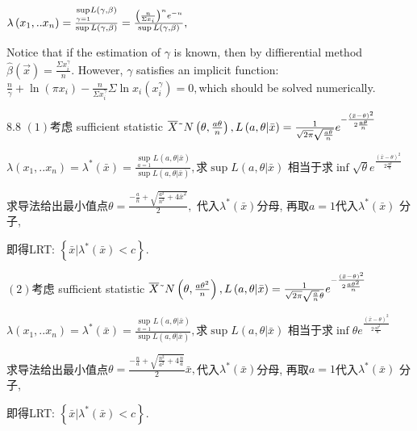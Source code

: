 \documentclass{article}
\begin{document}
$\lambda \left( x_{1},..x_{n}\right) =\frac{\underset{\gamma =1}{\sup }%
L\left( \gamma ,\beta \right) }{\sup L\left( \gamma ,\beta \right) }=\frac{%
\left( \frac{n}{\Sigma x_{i}}\right) ^{n}e^{-n}}{\sup L\left( \gamma ,\beta
\right) },$

Notice that if the estimation of $\gamma $ is known, then by diffierential
method $\hat{\beta}\left( \vec{x}\right) =\frac{\Sigma x_{i}^{\gamma }}{n}.$%
However, $\gamma $ satisfies an implicit function: $\frac{n}{\gamma }+\ln
\left( \pi x_{i}\right) -\frac{n}{\Sigma x_{i}^{\gamma }}\Sigma \ln
x_{i}\left( x_{i}^{\gamma }\right) =0,$which should be solved numerically.

8.8 $\left( 1\right) $考虑 sufficient statistic $\overline{X}%
\symbol{126}N\left( \theta ,\frac{a\theta }{n}\right) ,L\left( a,\theta |%
\bar{x}\right) =\frac{1}{\sqrt{2\pi }\sqrt{\frac{a\theta }{n}}}e^{-\frac{%
\left( \bar{x}-\theta \right) ^{2}}{2\frac{a\theta }{n}}}$

$\lambda \left( x_{1},..x_{n}\right) =\lambda ^{\ast }\left( \bar{x}\right) =%
\frac{\underset{a=1}{\sup }L\left( a,\theta |\bar{x}\right) }{\sup L\left(
a,\theta |\bar{x}\right) },$求$\sup L\left( a,\theta |\bar{x}\right) $%
相当于求$\inf \sqrt{\theta }e^{\frac{\left( \bar{x}%
-\theta \right) ^{2}}{2\frac{a\theta }{n}}}$

求导法给出最小值点$%
\theta =\frac{-\frac{a}{n}+\sqrt{\frac{a^{2}}{n^{2}}+4\bar{x}^{2}}}{2},$%
代入$\lambda ^{\ast }\left( \bar{x}\right) $分母,%
再取$a=1$代入$\lambda ^{\ast }\left( \bar{x}\right) $%
分子,

即得LRT: $\left\{ \bar{x}|\lambda ^{\ast }\left( \bar{x}\right)
<c\right\} .$

$\left( 2\right) $考虑 sufficient statistic $\overline{X}\symbol{%
126}N\left( \theta ,\frac{a\theta ^{2}}{n}\right) ,L\left( a,\theta |\bar{x}%
\right) =\frac{1}{\sqrt{2\pi }\sqrt{\frac{a}{n}}\theta }e^{-\frac{\left( 
\bar{x}-\theta \right) ^{2}}{2\frac{a\theta ^{2}}{n}}}$

$\lambda \left( x_{1},..x_{n}\right) =\lambda ^{\ast }\left( \bar{x}\right) =%
\frac{\underset{a=1}{\sup }L\left( a,\theta |\bar{x}\right) }{\sup L\left(
a,\theta |\bar{x}\right) },$求$\sup L\left( a,\theta |\bar{x}\right) $%
相当于求$\inf \theta e^{\frac{\left( \bar{x}-\theta
\right) ^{2}}{2\frac{a\theta ^{2}}{n}}}$

求导法给出最小值点$%
\theta =\frac{-\frac{n}{a}+\sqrt{\frac{n^{2}}{a^{2}}+4\frac{n}{a}}}{2}\bar{x}%
,$代入$\lambda ^{\ast }\left( \bar{x}\right) $分母,%
再取$a=1$代入$\lambda ^{\ast }\left( \bar{x}\right) $%
分子,

即得LRT: $\left\{ \bar{x}|\lambda ^{\ast }\left( \bar{x}\right)
<c\right\} .$
\end{document}
